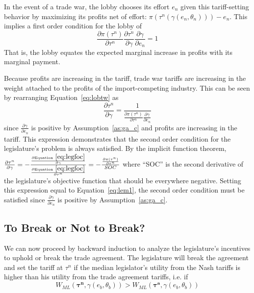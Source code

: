 \documentclass[10pt]{article}
\newcommand{\ve}{\theta}
\newcommand{\bta}{\bm{\tau^a}}
\newcommand{\btn}{\bm{\tau^n}}
\newcommand{\ga}{\gamma}
\begin{document}
In the event of a trade war, the lobby chooses its effort $e_n$ given this tariff-setting behavior by maximizing its profits net of effort: $\pi\left(\tau^n\left(\ga\left(e_n,\ve_n\right)\right)\right) - e_n$. This implies a first order condition for the lobby of
\begin{equation}
	\frac{\partial \pi(\tau^n)}{\partial \tau^n}\frac{\partial \tau^n}{\partial \ga} \frac{\partial \ga}{\partial e_n} = 1
  \label{eq:lobtw}
\end{equation}
That is, the lobby equates the expected marginal increase in profits with its marginal payment.

Because profits are increasing in the tariff, trade war tariffs are increasing in the weight attached to the profits of the import-competing industry. This can be seen by rearranging Equation~\ref{eq:lobtw} as 
\begin{equation}
  \frac{\partial \tau^n}{\partial \ga} = \frac{1}{\frac{\partial \pi(\tau^n)}{\partial \tau^n} \frac{\partial \ga}{\partial e_n}}
	\label{eq:lem1}
\end{equation}
since $\frac{\partial \ga}{\partial e_n}$ is positive by Assumption~\ref{as:ga_c} and profits are increasing in the tariff. This expression demonstrates that the second order condition for the legislature's problem is always satisfied. By the implicit function theorem, $\frac{\partial \tau^n}{\partial \ga} = -\frac{\frac{\partial \text{Equation}~\ref{eq:legfoc}}{\partial \ga}}{\frac{\partial \text{Equation}~\ref{eq:legfoc}}{\partial \tau^n}} = -\frac{\frac{\partial \pi(\tau^n)}{\partial \tau^n}}{SOC}$ where ``SOC'' is the second derivative of the legislature's objective function that should be everywhere negative. Setting this expression equal to Equation~\ref{eq:lem1}, the second order condition must be satisfied since $\frac{\partial \ga}{\partial e_n}$ is positive by Assumption~\ref{as:ga_c}.


\bigskip
\subsection{To Break or Not to Break?}
\label{sec:break}
We can now proceed by backward induction to analyze the legislature's incentives to uphold or break the trade agreement. The legislature will break the agreement and set the tariff at $\tau^n$ if the median legislator's utility from the Nash tariffs is higher than his utility from the trade agreement tariffs, i.e. if
\begin{equation}
  W_{ML}(\btn,\ga(e_b,\ve_b)) > W_{ML}\left(\bta,\ga(e_b,\ve_b)\right)
  \label{eq:lwcg}
\end{equation}
  
\end{document}
